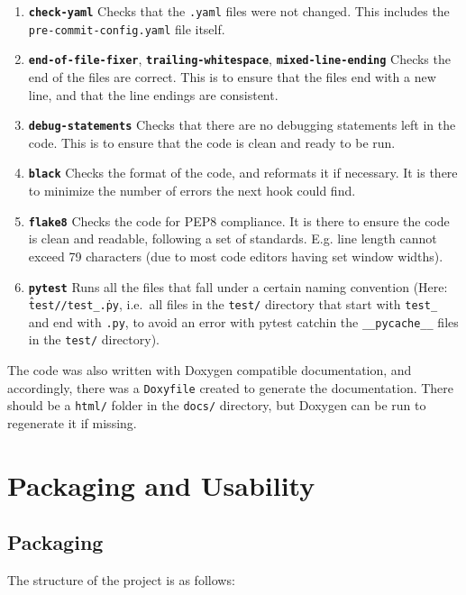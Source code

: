 \documentclass[12pt]{report} %
\begin{document}
\begin{enumerate}
  \item \textbf{\texttt{check-yaml}} Checks that the \texttt{.yaml} files were not changed. This includes the \texttt{pre-commit-config.yaml} file itself.
  \item \textbf{\texttt{end-of-file-fixer}}, \textbf{\texttt{trailing-whitespace}}, \textbf{\texttt{mixed-line-ending}} Checks the end of the files are correct. This is to ensure that the files end with a new line, and that the line endings are consistent.
  \item \textbf{\texttt{debug-statements}} Checks that there are no debugging statements left in the code. This is to ensure that the code is clean and ready to be run.
  \item \textbf{\texttt{black}} Checks the format of the code, and reformats it if necessary. It is there to minimize the number of errors the next hook could find.
  \item \textbf{\texttt{flake8}} Checks the code for PEP8 compliance. It is there to ensure the code is clean and readable, following a set of standards. E.g. line length cannot exceed 79 characters (due to most code editors having set window widths\cite{pep8_}).
  \item \textbf{\texttt{pytest}} Runs all the files that fall under a certain naming convention (Here: \texttt{\^test//test\_.\*\.py}, i.e.\ all files in the \texttt{test/} directory that start with \texttt{test\_} and end with \texttt{.py}, to avoid an error with pytest catchin the \texttt{\_\_pycache\_\_} files in the \texttt{test/} directory).
\end{enumerate}

The code was also written with Doxygen compatible documentation, and accordingly, there was a \texttt{Doxyfile} created to generate the documentation. There should be a \texttt{html/} folder in the \texttt{docs/} directory, but Doxygen can be run to regenerate it if missing.


\chapter{Packaging and Usability}

\section{Packaging}

The structure of the project is as follows:
\end{document}

